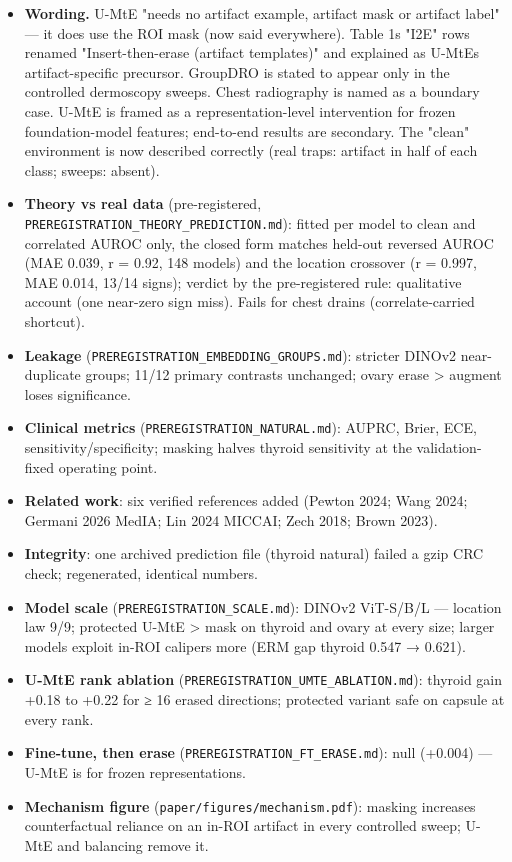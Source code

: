 {\begin{itemize}
\item
  \textbf{Wording.} U-MtE "needs no artifact example, artifact mask or artifact label" --- it does use the ROI mask (now said
  everywhere). Table 1\textquotesingle s "I2E" rows renamed "Insert-then-erase (artifact templates)" and explained as U-MtE\textquotesingle s
  artifact-specific precursor. GroupDRO is stated to appear only in the controlled dermoscopy sweeps. Chest
  radiography is named as a boundary case. U-MtE is framed as a representation-level intervention for frozen
  foundation-model features; end-to-end results are secondary. The "clean" environment is now described correctly
  (real traps: artifact in half of each class; sweeps: absent).
\item
  \textbf{Theory vs real data} (pre-registered, \texttt{PREREGISTRATION\_THEORY\_PREDICTION.md}): fitted per model to clean and
  correlated AUROC only, the closed form matches held-out reversed AUROC (MAE 0.039, r = 0.92, 148 models) and the
  location crossover (r = 0.997, MAE 0.014, 13/14 signs); verdict by the pre-registered rule: qualitative account
  (one near-zero sign miss). Fails for chest drains (correlate-carried shortcut).
\item
  \textbf{Leakage} (\texttt{PREREGISTRATION\_EMBEDDING\_GROUPS.md}): stricter DINOv2 near-duplicate groups; 11/12 primary contrasts
  unchanged; ovary erase \textgreater{} augment loses significance.
\item
  \textbf{Clinical metrics} (\texttt{PREREGISTRATION\_NATURAL.md}): AUPRC, Brier, ECE, sensitivity/specificity; masking halves
  thyroid sensitivity at the validation-fixed operating point.
\item
  \textbf{Related work}: six verified references added (Pewton 2024; Wang 2024; Germani 2026 MedIA; Lin 2024 MICCAI;
  Zech 2018; Brown 2023).
\item
  \textbf{Integrity}: one archived prediction file (thyroid natural) failed a gzip CRC check; regenerated, identical numbers.
\item
  \textbf{Model scale} (\texttt{PREREGISTRATION\_SCALE.md}): DINOv2 ViT-S/B/L --- location law 9/9; protected U-MtE \textgreater{} mask on
  thyroid and ovary at every size; larger models exploit in-ROI calipers more (ERM gap thyroid 0.547 → 0.621).
\item
  \textbf{U-MtE rank ablation} (\texttt{PREREGISTRATION\_UMTE\_ABLATION.md}): thyroid gain +0.18 to +0.22 for ≥ 16 erased
  directions; protected variant safe on capsule at every rank.
\item
  \textbf{Fine-tune, then erase} (\texttt{PREREGISTRATION\_FT\_ERASE.md}): null (+0.004) --- U-MtE is for frozen representations.
\item
  \textbf{Mechanism figure} (\texttt{paper/figures/mechanism.pdf}): masking increases counterfactual reliance on an in-ROI
  artifact in every controlled sweep; U-MtE and balancing remove it.
\end{itemize}

}
